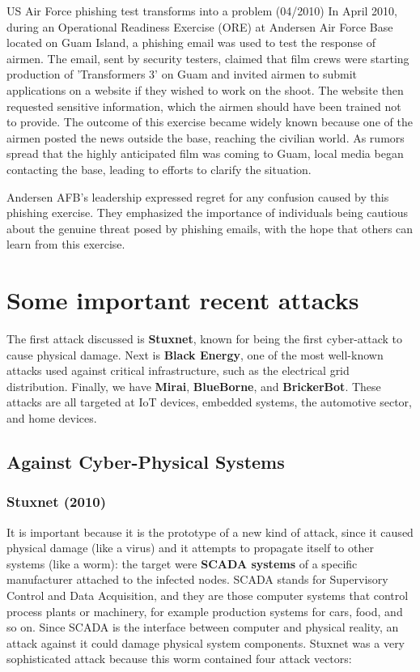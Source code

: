 \begin{casehistory}{US Air Force phishing test transforms into a problem (04/2010)}
	In April 2010, during an Operational Readiness Exercise (ORE) at Andersen Air Force Base located on Guam Island, a phishing email was used to test the response of airmen. The email, sent by security testers, claimed that film crews were starting production of 'Transformers 3' on Guam and invited airmen to submit applications on a website if they wished to work on the shoot. The website then requested sensitive information, which the airmen should have been trained not to provide. The outcome of this exercise became widely known because one of the airmen posted the news outside the base, reaching the civilian world. As rumors spread that the highly anticipated film was coming to Guam, local media began contacting the base, leading to efforts to clarify the situation.

	Andersen AFB's leadership expressed regret for any confusion caused by this phishing exercise. They emphasized the importance of individuals being cautious about the genuine threat posed by phishing emails, with the hope that others can learn from this exercise.
\end{casehistory}


\section{Some important recent attacks}
The first attack discussed is \textbf{Stuxnet}, known for being the first cyber-attack to cause physical damage. Next is \textbf{Black Energy}, one of the most well-known attacks used against critical infrastructure, such as the electrical grid distribution. Finally, we have \textbf{Mirai}, \textbf{BlueBorne}, and \textbf{BrickerBot}. These attacks are all targeted at IoT devices, embedded systems, the automotive sector, and home devices.

\subsection{Against Cyber-Physical Systems}

\subsubsection{Stuxnet (2010)}
It is important because it is the prototype of a new kind of attack, since it caused physical damage (like a virus) and it attempts to propagate itself to other systems (like a worm): the target were \textbf{SCADA systems} of a specific manufacturer attached to the infected nodes. SCADA stands for Supervisory Control and Data Acquisition, and they are those computer systems that control process plants or machinery, for example production systems for cars, food, and so on. Since SCADA is the interface between computer and physical reality, an attack against it could damage physical system components. Stuxnet was a very sophisticated attack because this worm contained four attack vectors:

